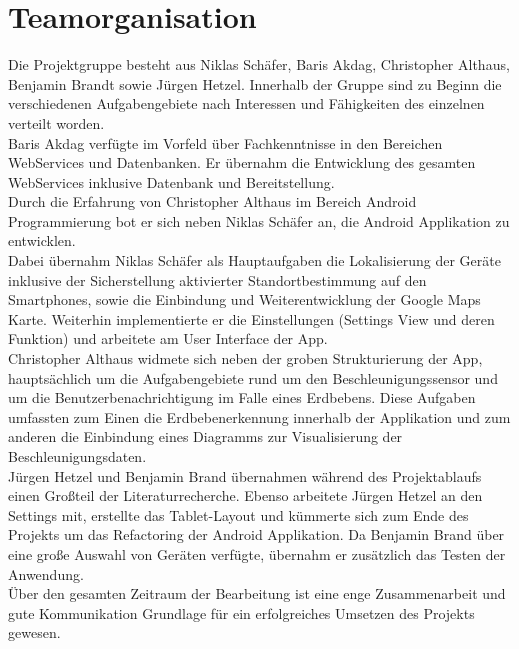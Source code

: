 \section{Teamorganisation}
Die Projektgruppe besteht aus Niklas Schäfer, Baris Akdag, Christopher Althaus, Benjamin Brandt sowie Jürgen Hetzel. Innerhalb der Gruppe sind zu Beginn die verschiedenen Aufgabengebiete nach Interessen und Fähigkeiten des einzelnen verteilt worden.\\
Baris Akdag verfügte im Vorfeld über Fachkenntnisse in den Bereichen WebServices und Datenbanken. Er übernahm die Entwicklung des gesamten WebServices inklusive Datenbank und Bereitstellung.\\
Durch die Erfahrung von Christopher Althaus im Bereich Android Programmierung bot er sich neben Niklas Schäfer an, die Android Applikation zu entwicklen.\\
Dabei übernahm Niklas Schäfer als Hauptaufgaben die Lokalisierung der Geräte inklusive der Sicherstellung aktivierter Standortbestimmung auf den Smartphones, sowie die Einbindung und Weiterentwicklung der Google Maps Karte. Weiterhin implementierte er die Einstellungen (Settings View und deren Funktion) und arbeitete am User Interface der App.\\ 
Christopher Althaus widmete sich neben der groben Strukturierung der App, hauptsächlich um die Aufgabengebiete rund um den Beschleunigungssensor und um die Benutzerbenachrichtigung im Falle eines Erdbebens. Diese Aufgaben umfassten zum Einen die Erdbebenerkennung innerhalb der Applikation und zum anderen die Einbindung eines Diagramms zur Visualisierung der Beschleunigungsdaten.\\
Jürgen Hetzel und Benjamin Brand übernahmen während des Projektablaufs einen Großteil der Literaturrecherche. Ebenso arbeitete Jürgen Hetzel an den Settings mit, erstellte das Tablet-Layout und kümmerte sich zum Ende des Projekts um das Refactoring der Android Applikation.
Da Benjamin Brand über eine große Auswahl von Geräten verfügte, übernahm er zusätzlich das Testen der Anwendung.\\
Über den gesamten Zeitraum der Bearbeitung ist eine enge Zusammenarbeit und gute Kommunikation Grundlage für ein erfolgreiches Umsetzen des Projekts gewesen.
\newpage